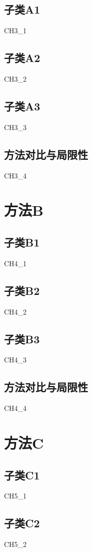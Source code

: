 \documentclass[12pt,a4paper]{ctexart}
\begin{document}
\subsection{子类A1}
{CH3_1}

\subsection{子类A2}
{CH3_2}

\subsection{子类A3}
{CH3_3}

\subsection{方法对比与局限性}
{CH3_4}

\section{方法B}
\subsection{子类B1}
{CH4_1}

\subsection{子类B2}
{CH4_2}

\subsection{子类B3}
{CH4_3}

\subsection{方法对比与局限性}
{CH4_4}

\section{方法C}
\subsection{子类C1}
{CH5_1}

\subsection{子类C2}
{CH5_2}
\end{document}
